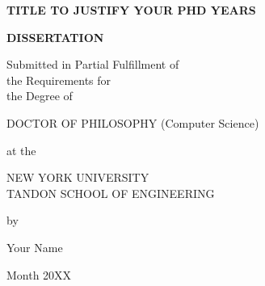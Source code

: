 \documentclass[12pt,draft,letterpaper]{report}
\newcommand{\thesistitle}{TITLE TO JUSTIFY YOUR PHD YEARS}
\newcommand{\thesisauthor}{Your Name}
\newcommand{\graddate}{Month 20XX} %
\begin{document}

\thispagestyle{empty}
\begin{center}
{\bfseries 
  {\large\thesistitle}
  \vspace{1in}
  
 {\large {\bf DISSERTATION}}\\
  \vspace{.5in}
  
  \begin{doublespace}
  {\large  
  Submitted in Partial Fulfillment of\\
  the Requirements for\\
  the Degree of\\}
  \end{doublespace}
  \vspace{.5in}
  
  {\large DOCTOR OF PHILOSOPHY (Computer Science)}\\
  \vspace{.5in}
  
  at the \\
  \vspace{.2in}
  
  {\large
  NEW YORK UNIVERSITY\\
  \vspace{-0.05in}
  TANDON SCHOOL OF ENGINEERING\\
  }
  \vspace{.2in}
  
  by
  \vspace{.5in}

  {\large\thesisauthor}
  \vspace{.5in}

  {\large\graddate}
}

\end{center}

\newpage
\end{document}
